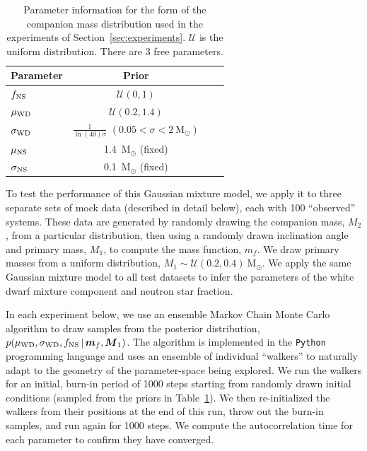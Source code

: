 \documentclass[letterpaper,12pt,preprint]{aastex}
\newcommand{\given}{\,|\,}
\newcommand{\Msun}{\mathrm{M}_\odot}
\newcommand{\bs}[1]{\boldsymbol{#1}}
\begin{document}
\begin{table}[ht]
\begin{center}
	\begin{tabular}{l c c l} \toprule
		Parameter & Prior \\\toprule
		$f_{\rm NS}$ & $\mathcal{U}(0, 1)$ \\ 
		$\mu_{\rm WD}$ & $\mathcal{U}(0.2, 1.4)$ \\ 
		$\sigma_{\rm WD}$ & $\frac{1}{\ln(40)\sigma}$ $(0.05 < \sigma < 2~\Msun)$ \\ 
		$\mu_{\rm NS}$ & 1.4~$\Msun$ (fixed) \\ 
		$\sigma_{\rm NS}$ &  0.1~$\Msun$ (fixed) \\
		\bottomrule
		\end{tabular}
	\caption{Parameter information for the form of the companion mass distribution used in the experiments of Section~\ref{sec:experiments}. $\mathcal{U}$ is the uniform distribution. There are 3 free parameters. \label{tbl:parameters}}
\end{center}
\end{table}

To test the performance of this Gaussian mixture model, we apply it to three separate sets of mock data (described in detail below), each with 100 ``observed'' systems. These data are generated by randomly drawing the companion mass, $M_2$, from a particular distribution, then using a randomly drawn inclination angle and primary mass, $M_1$, to compute the mass function, $m_f$. We draw primary masses from a uniform distribution, $M_1 \sim \mathcal{U}(0.2,0.4)~\Msun$. We apply the same Gaussian mixture model to all test datasets to infer the parameters of the white dwarf mixture component and neutron star fraction.

In each experiment below, we use an ensemble Markov Chain Monte Carlo algorithm \citep{goodman10} to draw samples from the posterior distribution, $p(\mu_{\rm WD}, \sigma_{\rm WD}, f_{\rm NS} \given \bs{m}_f, \bs{M}_1)$. The algorithm is implemented in the \texttt{Python} programming language \citep{foremanmackey13} and uses an ensemble of individual ``walkers'' to naturally adapt to the geometry of the parameter-space being explored. We run the walkers for an initial, burn-in period of 1000 steps starting from randomly drawn initial conditions (sampled from the priors in Table~\ref{tbl:parameters}). We then re-initialized the walkers from their positions at the end of this run, throw out the burn-in samples, and run again for 1000 steps. We compute the autocorrelation time for each parameter to confirm they have converged.
\end{document}
